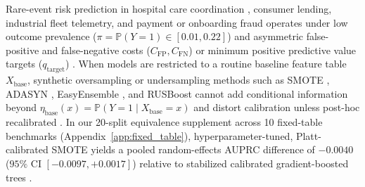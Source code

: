 \documentclass[11pt]{article}
\theoremstyle{remark}
\begin{document}
Rare-event risk prediction in hospital care coordination \citep{strack2014impact}, consumer lending, industrial fleet telemetry, and payment or onboarding fraud \citep{dalpozzolo2014learned,jesus2022turning} operates under low outcome prevalence ($\pi = \mathbb{P}(Y=1) \in [0.01, 0.22]$) and asymmetric false-positive and false-negative costs ($C_{\text{FP}}, C_{\text{FN}}$) or minimum positive predictive value targets ($q_{\text{target}}$) \citep{davis2006relationship,saito2015precision,vickers2006decision,kerr2016assessing}. When models are restricted to a routine baseline feature table $X_{\text{base}}$, synthetic oversampling or undersampling methods such as SMOTE \citep{chawla2002smote}, ADASYN \citep{he2008adasyn}, EasyEnsemble \citep{liu2009exploratory}, and RUSBoost \citep{seiffert2010rusboost} cannot add conditional information beyond $\eta_{\text{base}}(x) = \mathbb{P}(Y=1 \mid X_{\text{base}}=x)$ and distort calibration unless post-hoc recalibrated \citep{elkan2001foundations,saerens2002adjusting,vandengoorbergh2022harm,elor2022to}. In our 20-split equivalence supplement across 10 fixed-table benchmarks (Appendix~\ref{app:fixed_table}), hyperparameter-tuned, Platt-calibrated SMOTE yields a pooled random-effects AUPRC difference of $-0.0040$ ($95\%$ CI $[-0.0097, +0.0017]$) relative to stabilized calibrated gradient-boosted trees \citep{ke2017lightgbm}.
\end{document}
